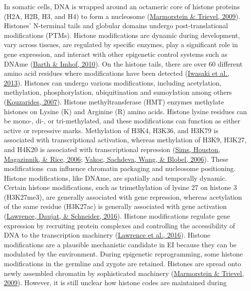 \documentclass[12pt,twoside]{reedthesis}
\begin{document}
In somatic cells, DNA is wrapped around an octameric core of histone
proteins (H2A, H2B, H3, and H4) to form a nucleosome (\protect\hyperlink{ref-marmorstein2009}{Marmorstein \& Trievel, 2009}).
Histones' N-terminal tails and globular domains undergo
post-translational modifications (PTMs). Histone modifications are
dynamic during development, vary across tissues, are regulated by
specific enzymes, play a significant role in gene expression, and
interact with other epigenetic control systems such as DNAme
(\protect\hyperlink{ref-barth2010}{Barth \& Imhof, 2010}). On the histone tails, there are over 60 different amino
acid residues where modifications have been detected (\protect\hyperlink{ref-iwasaki2013}{Iwasaki et al., 2013}).
Histones can undergo various modifications, including acetylation,
methylation, phosphorylation, ubiquitination and sumoylation among
others (\protect\hyperlink{ref-kouzarides2007}{Kouzarides, 2007}). Histone methyltransferase (HMT) enzymes
methylate histones on Lysine (K) and Arginine (R) amino acids. Histone
lysine residues can be mono-, di-, or tri-methylated, and these
modifications can function as either active or repressive marks.
Methylation of H3K4, H3K36, and H3K79 is associated with transcriptional
activation, whereas methylation of H3K9, H3K27, and H4K20 is associated
with transcriptional repression (\protect\hyperlink{ref-sims2006}{Sims, Houston, Magazinnik, \& Rice, 2006}; \protect\hyperlink{ref-vakoc2006}{Vakoc, Sachdeva, Wang, \& Blobel, 2006}). These
modifications~can influence chromatin packaging and nucleosome
positioning. Histone modifications, like DNAme, are spatially and
temporally dynamic. Certain histone modifications, such as
trimethylation of lysine 27 on histone 3 (H3K27me3), are generally
associated with gene repression, whereas acetylation of the same residue
(H3K27ac) is generally associated with gene activation (\protect\hyperlink{ref-lawrence2016}{Lawrence, Daujat, \& Schneider, 2016}).
Histone modifications regulate gene expression by recruiting protein
complexes and controlling the accessibility of DNA to the transcription
machinery (\protect\hyperlink{ref-lawrence2016}{Lawrence et al., 2016}). Histone modifications are a plausible
mechanistic candidate in EI because they can be modulated by the
environment. During epigenetic reprogramming, some histone modifications
in the germline and zygote are retained. Histones are spread onto newly
assembled chromatin by sophisticated machinery (\protect\hyperlink{ref-marmorstein2009}{Marmorstein \& Trievel, 2009}).
However, it is still unclear how histone codes are maintained during
\end{document}

